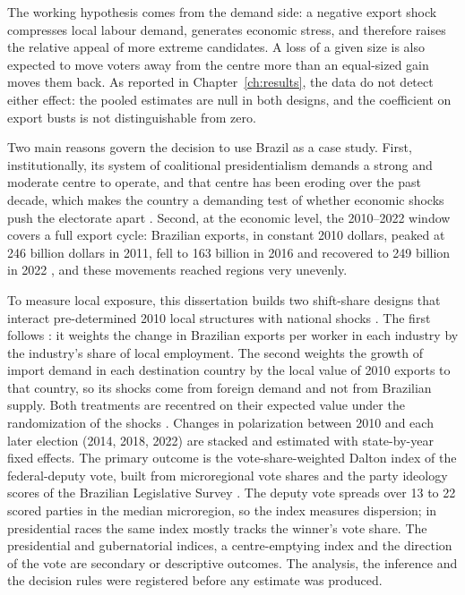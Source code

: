 \documentclass[
	11pt,				%
	oneside,			%
	a4paper,			%
	english,			%
	english				%
	]{abntex2ppgsi}
\theoremstyle{plain}
\theoremstyle{remark}
\theoremstyle{plain}%
\theoremstyle{remark}%
\begin{document}
The working hypothesis comes from the demand side: a negative export shock compresses local labour demand, generates economic stress, and therefore raises the relative appeal of more extreme candidates. A loss of a given size is also expected to move voters away from the centre more than an equal-sized gain moves them back. As reported in Chapter~\ref{ch:results}, the data do not detect either effect: the pooled estimates are null in both designs, and the coefficient on export busts is not distinguishable from zero.

Two main reasons govern the decision to use Brazil as a case study. First, institutionally, its system of coalitional presidentialism demands a strong and moderate centre to operate, and that centre has been eroding over the past decade, which makes the country a demanding test of whether economic shocks push the electorate apart \cite{hunter, ZUCCO}. Second, at the economic level, the 2010--2022 window covers a full export cycle: Brazilian exports, in constant 2010 dollars, peaked at 246 billion dollars in 2011, fell to 163 billion in 2016 and recovered to 249 billion in 2022 \cite{cooney}, and these movements reached regions very unevenly.

To measure local exposure, this dissertation builds two shift-share designs that interact pre-determined 2010 local structures with national shocks \cite{Rettl, bartik, quasi-experimental}. The first follows : it weights the change in Brazilian exports per worker in each industry by the industry's share of local employment. The second weights the growth of import demand in each destination country by the local value of 2010 exports to that country, so its shocks come from foreign demand and not from Brazilian supply. Both treatments are recentred on their expected value under the randomization of the shocks \cite{borusyakhull2023}. Changes in polarization between 2010 and each later election (2014, 2018, 2022) are stacked and estimated with state-by-year fixed effects. The primary outcome is the vote-share-weighted Dalton index \cite{dalton} of the federal-deputy vote, built from microregional vote shares and the party ideology scores of the Brazilian Legislative Survey \cite{ZUCCO}. The deputy vote spreads over 13 to 22 scored parties in the median microregion, so the index measures dispersion; in presidential races the same index mostly tracks the winner's vote share. The presidential and gubernatorial indices, a centre-emptying index \cite{wachsmann} and the direction of the vote are secondary or descriptive outcomes. The analysis, the inference and the decision rules were registered before any estimate was produced.
\end{document}
